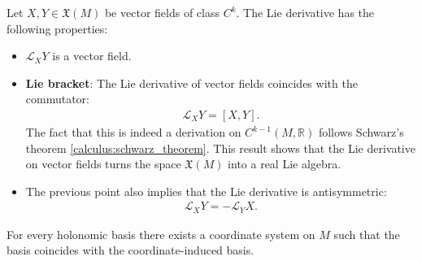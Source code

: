     \begin{property}
        Let $X,Y\in\mathfrak{X}(M)$ be vector fields of class $C^k$. The Lie derivative has the following properties:
        \begin{itemize}
            \item $\mathcal{L}_XY$ is a vector field.
            \item \textbf{Lie bracket}: The Lie derivative of vector fields coincides with the commutator:
                \begin{gather}
                    \label{diff:lie_bracket}
                    \mathcal{L}_XY = [X, Y].
                \end{gather}
                The fact that this is indeed a derivation on $C^{k-1}(M, \mathbb{R})$ follows Schwarz's theorem \ref{calculus:schwarz_theorem}. This result shows that the Lie derivative on vector fields turns the space $\mathfrak{X}(M)$ into a real Lie algebra.
            \item The previous point also implies that the Lie derivative is antisymmetric:
                \begin{gather}
                    \label{diff:lie_derivative_antisymmetry}
                    \mathcal{L}_XY = -\mathcal{L}_YX.
                \end{gather}
        \end{itemize}
    \end{property}

    \begin{property}
        For every holonomic basis there exists a coordinate system on $M$ such that the basis coincides with the coordinate-induced basis.
    \end{property}

